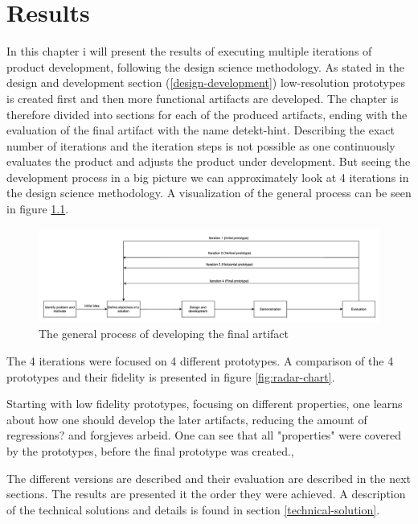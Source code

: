 \documentclass{report}
\begin{document}
\chapter{Results}
\label{results}
In this chapter i will present the results of executing multiple iterations of product development, following the design science methodology. As stated in the design and development section (\ref{design-development}) low-resolution 
prototypes is created first and then more functional artifacts are developed. The chapter is therefore divided into sections for each of the produced artifacts, ending with the evaluation of the final artifact with the name detekt-hint. Describing the exact number of iterations and the iteration steps is not possible as one continuously evaluates the product and adjusts the product under development. But seeing the development process in a big picture we can approximately look at 4 iterations in the design science methodology. A visualization of the general process can be seen in figure \ref{fig:workflow}.

\begin{figure}[h!]
    \centering
    \includegraphics[width=\linewidth]{../images/workflow.png}
    \caption{The general process of developing the final artifact}
    \label{fig:workflow}
\end{figure}

The 4 iterations were focused on 4 different prototypes. A comparison of the 4 prototypes and their fidelity is presented in figure \ref{fig:radar-chart}. 




Starting with low fidelity prototypes, focusing on different properties, one learns about how one should develop the later artifacts, reducing the amount of regressions? and forgjeves arbeid. One can see that all "properties" were covered by the prototypes, before the final prototype was created., 

The different versions are described and their evaluation are described in the next sections. The results are presented it the order they were achieved. A description of the technical solutions and details is found in section \ref{technical-solution}.
\end{document}
